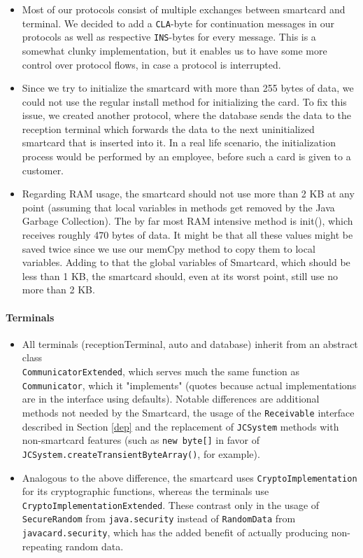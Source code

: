 \documentclass[a4paper]{article}
\begin{document}
\begin{itemize}
    \item Most of our protocols consist of multiple exchanges between smartcard and terminal. We decided to add a \texttt{CLA}-byte for continuation messages in our protocols as well as respective \texttt{INS}-bytes for every message. This is a somewhat clunky implementation, but it enables us to have some more control over protocol flows, in case a protocol is interrupted.
    \item Since we try to initialize the smartcard with more than 255 bytes of data, we could not use the regular install method for initializing the card. To fix this issue, we created another protocol, where the database sends the data to the reception terminal which forwards the data to the next uninitialized smartcard that is inserted into it. In a real life scenario, the initialization process would be performed by an employee, before such a card is given to a customer.
    \item Regarding RAM usage, the smartcard should not use more than 2 KB at any point (assuming that local variables in methods get removed by the Java Garbage Collection). The by far most RAM intensive method is init(), which receives roughly 470 bytes of data. It might be that all these values might be saved twice since we use our memCpy method to copy them to local variables. Adding to that the global variables of Smartcard, which should be less than 1 KB, the smartcard should, even at its worst point, still use no more than 2 KB.
\end{itemize}
\paragraph{Terminals}
\begin{itemize}
    \item All terminals (receptionTerminal, auto and database) inherit from an abstract class\\ \texttt{CommunicatorExtended}, which serves much the same function as \texttt{Communicator}, which it "implements" (quotes because actual implementations are in the interface using defaults). Notable differences are additional methods not needed by the Smartcard, the usage of the \texttt{Receivable} interface described in Section \ref{dep} and the replacement of \texttt{JCSystem} methods with non-smartcard features (such as \texttt{new byte[]} in favor of\\ \texttt{JCSystem.createTransientByteArray()}, for example).
    \item Analogous to the above difference, the smartcard uses \texttt{CryptoImplementation} for its cryptographic functions, whereas the terminals use \texttt{CryptoImplementationExtended}. These contrast only in the usage of \texttt{SecureRandom} from \texttt{java.security} instead of \texttt{RandomData} from \texttt{javacard.security}, which has the added benefit of actually producing non-repeating random data. 
\end{itemize}
\end{document}
